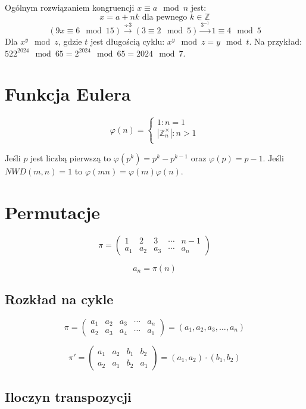 \documentclass{../notatki}
\begin{document}
\noindent
Ogólnym rozwiązaniem kongruencji $x \equiv a \mod n$ jest:
$$
x = a + nk \text{ dla pewnego } k \in \mathbb{Z}
$$
$$
(9x \equiv 6 \mod 15) \stackrel{\div 3}{\rightarrow} (3 \equiv 2 \mod 5)
\stackrel{3^{-1}}{\rightarrow} 1 \equiv 4 \mod 5
$$
Dla $x^y \mod z$, gdzie $t$ jest długością cyklu: $x^y \mod z = y \mod t$.
Na przykład: $522^{2024} \mod 65 = 2^{2024} \mod 65 = 2024 \mod 7$.

\section{Funkcja Eulera}

$$
\varphi(n) =
\begin{cases}
  1 : n = 1\\
  |\mathbb{Z}_n^\times| : n > 1\\
\end{cases}
$$

Jeśli $p$ jest liczbą pierwszą to $\varphi(p^k) = p^k - p^{k-1}$ oraz
$\varphi(p) = p - 1$. Jeśli $NWD(m, n) = 1$ to $\varphi(mn) =
\varphi(m)\varphi(n)$.


\section{Permutacje}

$$
\pi =
\begin{pmatrix}
  1   & 2   & 3   & \cdots & n-1   \\
  a_1 & a_2 & a_3 & \cdots &  a_n
\end{pmatrix}
$$

$$
a_n = \pi(n)
$$

\subsection{Rozkład na cykle}

$$
\pi =
\begin{pmatrix}
  a_1 & a_2 & a_3 & \cdots & a_n   \\
  a_2 & a_3 & a_4 & \cdots & a_1
\end{pmatrix}
= (a_1, a_2, a_3, \dots, a_n)
$$

$$
\pi' =
\begin{pmatrix}
  a_1 & a_2 & b_1 & b_2   \\
  a_2 & a_1 & b_2 & a_1
\end{pmatrix}
= (a_1, a_2) \cdot (b_1, b_2)
$$

\subsection{Iloczyn transpozycji}
\end{document}
